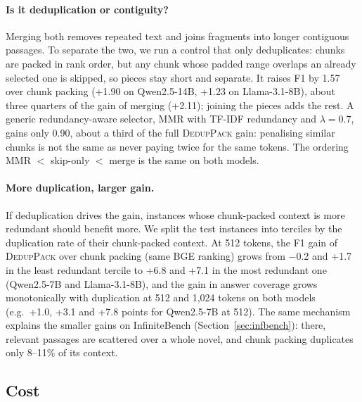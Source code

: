 \documentclass[11pt]{article}
\newcommand{\spk}{\textsc{DedupPack}}
\begin{document}
\paragraph{Is it deduplication or contiguity?} Merging both removes repeated text and joins fragments into longer contiguous passages. To separate the two, we run a control that only deduplicates: chunks are packed in rank order, but any chunk whose padded range overlaps an already selected one is skipped, so pieces stay short and separate. It raises F1 by 1.57 over chunk packing (+1.90 on Qwen2.5-14B, +1.23 on Llama-3.1-8B), about three quarters of the gain of merging (+2.11); joining the pieces adds the rest. A generic redundancy-aware selector, MMR \citep{carbonell1998mmr} with TF-IDF redundancy and $\lambda=0.7$, gains only 0.90, about a third of the full \spk{} gain: penalising similar chunks is not the same as never paying twice for the same tokens. The ordering MMR $<$ skip-only $<$ merge is the same on both models.

\paragraph{More duplication, larger gain.} If deduplication drives the gain, instances whose chunk-packed context is more redundant should benefit more. We split the test instances into terciles by the duplication rate of their chunk-packed context. At 512 tokens, the F1 gain of \spk{} over chunk packing (same BGE ranking) grows from $-$0.2 and +1.7 in the least redundant tercile to +6.8 and +7.1 in the most redundant one (Qwen2.5-7B and Llama-3.1-8B), and the gain in answer coverage grows monotonically with duplication at 512 and 1,024 tokens on both models (e.g.\ +1.0, +3.1 and +7.8 points for Qwen2.5-7B at 512). The same mechanism explains the smaller gains on InfiniteBench (Section~\ref{sec:infbench}): there, relevant passages are scattered over a whole novel, and chunk packing duplicates only 8--11\% of its context.

\subsection{Cost}
\label{sec:cost}
\end{document}
